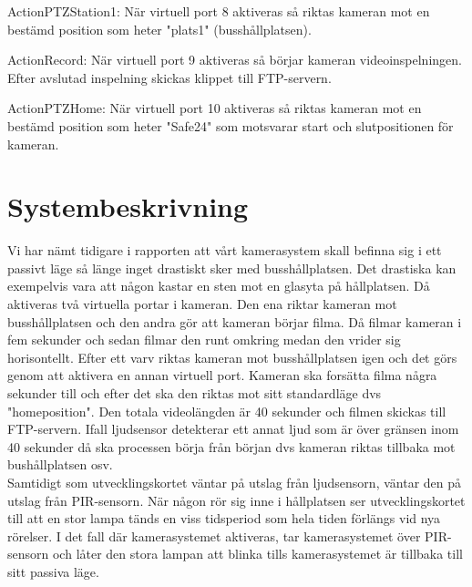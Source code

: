 ActionPTZStation1: När virtuell port 8 aktiveras så riktas kameran mot en bestämd position som  heter "plats1" (busshållplatsen).

ActionRecord: När virtuell port 9 aktiveras så börjar kameran videoinspelningen. Efter avslutad inspelning skickas klippet till FTP-servern.

ActionPTZHome: När virtuell port 10 aktiveras så riktas kameran mot en bestämd position som heter "Safe24"  som motsvarar start och slutpositionen för kameran.


 








\clearpage
\section{Systembeskrivning}
Vi har nämt tidigare i rapporten att vårt kamerasystem skall befinna sig i ett passivt läge så länge inget drastiskt sker med busshållplatsen. Det drastiska kan exempelvis vara att någon kastar en sten mot en glasyta på hållplatsen.
 Då aktiveras två virtuella portar i kameran. Den ena riktar kameran mot busshållplatsen och den andra gör att kameran börjar filma. Då filmar kameran i fem sekunder och sedan filmar den runt omkring medan den vrider sig horisontellt. Efter ett varv riktas kameran mot busshållplatsen igen och det görs genom att aktivera en annan virtuell port. Kameran ska forsätta filma några sekunder till och efter det ska den riktas mot sitt standardläge dvs "homeposition". Den totala videolängden är 40 sekunder och filmen skickas till FTP-servern. Ifall ljudsensor detekterar ett annat ljud som är över gränsen inom 40 sekunder då ska processen börja från början dvs kameran riktas tillbaka mot bushållplatsen osv.\\
 Samtidigt som utvecklingskortet väntar på utslag från ljudsensorn, väntar den på utslag från PIR-sensorn. När någon rör sig inne i hållplatsen ser utvecklingskortet till att en stor lampa tänds en viss tidsperiod som hela tiden förlängs vid nya rörelser. I det fall där kamerasystemet aktiveras, tar kamerasystemet över PIR-sensorn och låter den stora lampan att blinka tills kamerasystemet är tillbaka till sitt passiva läge.

